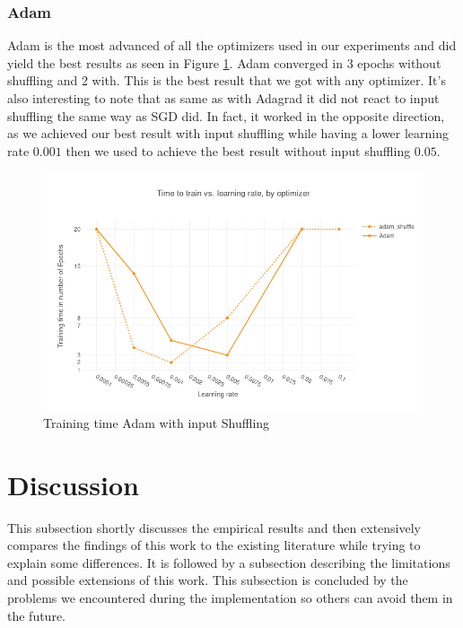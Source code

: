 \documentclass[conference]{IEEEtran}
\begin{document}
\subsubsection{Adam}
Adam is the most advanced of all the optimizers used in our experiments and did yield the best results as seen in Figure \ref{fig:results_adam_shuffle}. Adam converged in 3 epochs without shuffling and 2 with. This is the best result that we got with any optimizer.  It's also interesting to note that as same as with Adagrad it did not react to input shuffling the same way as SGD did. In fact, it worked in the opposite direction, as we achieved our best result with input shuffling while having a lower learning rate $0.001$ then we used to achieve the best result without input shuffling $0.05$.
\begin{figure}[h]
    \centering
            \includegraphics[scale=0.45]{images/results_adam_shuffle} 
    \caption{Training time Adam with input Shuffling}
    \label{fig:results_adam_shuffle}
\end{figure}

\section{Discussion}\label{chap:discussion}

This subsection shortly discusses the empirical results and then extensively compares the findings of this work to the existing literature while trying to explain some differences. It is followed by a subsection describing the limitations and possible extensions of this work. This subsection is concluded by the problems we encountered during the implementation so others can avoid them in the future.
\end{document}
